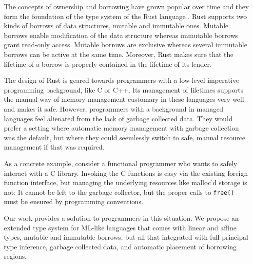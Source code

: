 The concepts of ownership and borrowing have grown popular over time
and they form the foundation of the type system of the Rust language
\cite{rust}. Rust supports two kinds of borrows of data structures, mutable and immutable
ones. Mutable borrows enable modification of the data structure
whereas immutable borrows grant read-only access. Mutable borrows are
exclusive whereas several immutable borrows can be active at the same
time. Moreover, Rust makes sure that the lifetime of a
borrow is properly contained in the lifetime of its lender. 

The design of Rust is geared towards programmers with a low-level
imperative programming background, like C or C++. Its management of
lifetimes supports the manual way of memory management customary in
these languages very well and makes it safe. However, programmers with
a background in managed languages feel alienated from the lack of garbage
collected data. They would prefer a setting where automatic memory
management with garbage collection was the default, but where they
could seemlessly switch to safe, manual resource management if that
was required.

As a concrete example, consider a functional programmer who wants to
safely interact with a C library. Invoking the C functions is easy via
the existing foreign function interface, but managing the underlying
resources like malloc'd storage is not: It cannot be left to the
garbage collector, but the proper calls to \texttt{free()} must be
ensured by programming conventions.

Our work provides a solution to programmers in this situation. We
propose an extended type system for ML-like languages that comes with
linear and affine types, mutable and immutable borrows, but all that
integrated with full principal type inference, garbage collected data, and
automatic placement of borrowing regions.

